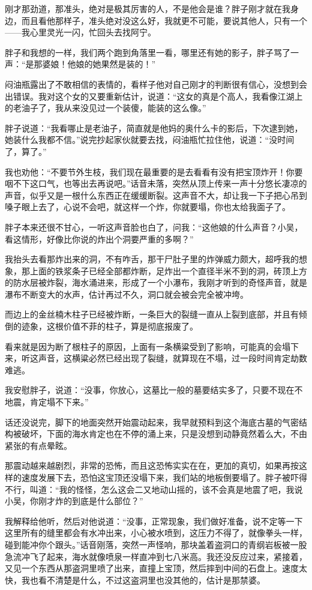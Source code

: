 刚才那劲道，那准头，绝对是极其厉害的人，不是他会是谁？胖子刚才就在我身边，而且看他那样子，准头绝对没这么好，我就更不可能，要说其他人，只有一个——我心里灵光一闪，忙回头去找阿宁。

胖子和我想的一样，我们两个跑到角落里一看，哪里还有她的影子，胖子骂了一声：“是那婆娘！他娘的她果然是装的！”

闷油瓶露出了不敢相信的表情的，看样子他对自己刚才的判断很有信心，没想到会出错误。我对这个女的又要重新估计，说道：“这女的真是个高人，我看像江湖上的老油子了，我从来没见过一个装傻，能装的这么像。”

胖子说道：“我看哪止是老油子，简直就是他妈的奥什么卡的影后，下次逮到她，她装什么我都不信。”说完抄起家伙就要去找，闷油瓶忙拉住他，说道：“没时间了，算了。”

我也劝他：“不要节外生枝，我们现在最重要的是去看看有没有把宝顶炸开！你要咽不下这口气，也等出去再说吧。”话音未落，突然从顶上传来一声十分悠长凄凉的声音，似乎又是一根什么东西正在缓缓断裂。这声音不大，却让我一下子把心吊到嗓子眼上去了，心说不会吧，就这样一个炸，你就要塌，你也太给我面子了。

胖子本来还很不甘心，一听这声音脸也白了，问我：“这他娘的什么声音？小吴，看这情形，好像比你说的炸出个洞要严重的多啊？”

我抬头去看那炸出来的洞，不有咋舌，那干尸肚子里的炸弹威力颇大，超呼我的想象，那上面的铁浆条子已经全部都炸断，足炸出一个直径半米不到的洞，砖顶上方的防水层被炸裂，海水涌进来，形成了一个小瀑布，我刚才听到的奇怪声音，就是瀑布不断变大的水声，估计再过不久，洞口就会被会完全被冲垮。

而边上的金丝楠木柱子已经被炸断，一条巨大的裂缝一直从上裂到底部，并且有倾倒的迹象，这根价值不菲的柱子，算是彻底报废了。

看来就是因为断了根柱子的原因，上面有一条横粱受到了影响，可能真的会塌下来，听这声音，这横粱必然已经出现了裂缝，就算现在不塌，过一段时间肯定劫数难逃。

我安慰胖子，说道：“没事，你放心，这墓比一般的墓要结实多了，只要不现在不地震，肯定塌不下来。”

话还没说完，脚下的地面突然开始震动起来，我早就预料到这个海底古墓的气密结构被破坏，下面的海水肯定也在不停的涌上来，只是没想到动静竟然着么大，不由紧张的有点晕眩。

那震动越来越剧烈，非常的恐怖，而且这恐怖实实在在，更加的真切，如果再按这样的速度发展下去，恐怕这宝顶还没塌下来，我们站的地板倒要塌了。胖子被吓得不行，叫道：“我的怪怪，怎么这会二又地动山摇的，该不会真是地震了吧，我说小吴，你刚才炸的到底是什么部位？”

我解释给他听，然后对他说道：“没事，正常现象，我们做好准备，说不定等一下这里所有的缝里都会有水冲出来，小心被水喷到，这压力不得了，就像拳头一样，碰到能冲你个跟头。”话音刚落，突然一声怪响，那块盖着盗洞口的青纲岩板被一股急流冲飞了起来，海水就像喷泉一样直冲到七八米高。我还没反应过来，紧接着，又见一个东西从那盗洞里喷了出来，直撞上宝顶，然后摔到中间的石盘上。速度太快，我也看不清楚是什么，不过这盗洞里也没其他的，估计是那禁婆。

